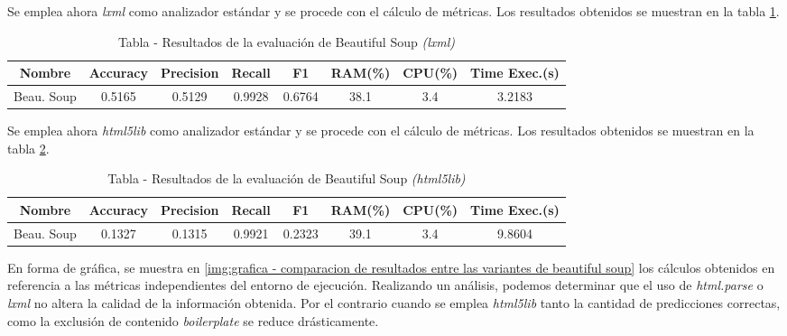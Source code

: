 Se emplea ahora \emph{lxml} como analizador estándar y se procede con el cálculo de métricas. Los resultados
obtenidos se muestran en la tabla \ref{tab:tabla - resultados de la evaluacion de beautiful soup lxml}.

\begin{table}[h]
    \begin{center}
      \begin{tabular}{| c | c | c | c | c | c | c | c |} \hline 
       \textbf{Nombre} & \textbf{Accuracy} & \textbf{Precision}  & \textbf{Recall} & \textbf{F1} & \textbf{RAM(\%)} & \textbf{CPU(\%)} & \textbf{Time Exec.(s)} \\ \hline
       Beau. Soup & 0.5165 & 0.5129 & 0.9928 & 0.6764 & 38.1 & 3.4 & 3.2183 \\ \hline
      \end{tabular}
      \caption{Tabla - Resultados de la evaluación de Beautiful Soup \emph{(lxml)}}
      \label{tab:tabla - resultados de la evaluacion de beautiful soup lxml}
    \end{center}
\end{table}

Se emplea ahora \emph{html5lib} como analizador estándar y se procede con el cálculo de métricas. Los 
resultados obtenidos se muestran en la tabla 
\ref{tab:tabla - resultados de la evaluacion de beautiful soup html5lib}.

\begin{table}[h]
    \begin{center}
      \begin{tabular}{| c | c | c | c | c | c | c | c |} \hline 
       \textbf{Nombre} & \textbf{Accuracy} & \textbf{Precision}  & \textbf{Recall} & \textbf{F1} & \textbf{RAM(\%)} & \textbf{CPU(\%)} & \textbf{Time Exec.(s)} \\ \hline
       Beau. Soup & 0.1327 & 0.1315 & 0.9921 & 0.2323 & 39.1 & 3.4 & 9.8604 \\ \hline
      \end{tabular}
      \caption{Tabla - Resultados de la evaluación de Beautiful Soup \emph{(html5lib)}}
      \label{tab:tabla - resultados de la evaluacion de beautiful soup html5lib}
    \end{center}
\end{table}

En forma de gráfica, se muestra en \ref{img:grafica - comparacion de resultados entre las variantes de beautiful soup} los 
cálculos obtenidos en referencia a las métricas independientes del entorno de ejecución. Realizando un
análisis, podemos determinar que el uso de \emph{html.parse} o \emph{lxml} no altera la calidad de la 
información obtenida. Por el contrario cuando se emplea \emph{html5lib} tanto la cantidad de predicciones 
correctas, como la exclusión de contenido \emph{boilerplate} se reduce drásticamente.

